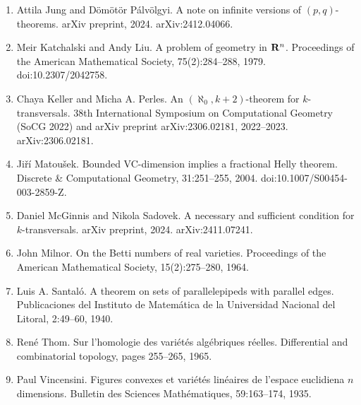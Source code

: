 \documentclass[10pt,a4paper]{amsart}
\begin{document}
\begin{enumerate}
\item[]  [13]  Attila Jung and Dömötör Pálvölgyi.  A note on infinite versions of $(p,q)$-theorems.  arXiv preprint, 2024.  arXiv:2412.04066.  
\item[]  [14]  Meir Katchalski and Andy Liu.  A problem of geometry in ${\bf R}^{n}$.  Proceedings of the American Mathematical Society, 75(2):284–288, 1979.  doi:10.2307/2042758.  
\item[]  [15]  Chaya Keller and Micha A. Perles.  An $(\aleph_{0},k+2)$-theorem for $k$-transversals.  38th International Symposium on Computational Geometry (SoCG 2022) and arXiv preprint arXiv:2306.02181, 2022–2023.  arXiv:2306.02181.  
\item[]  [16]  Jiří Matoušek.  Bounded VC-dimension implies a fractional Helly theorem.  Discrete \& Computational Geometry, 31:251–255, 2004.  doi:10.1007/S00454-003-2859-Z.  
\item[]  [17]  Daniel McGinnis and Nikola Sadovek.  A necessary and sufficient condition for $k$-transversals.  arXiv preprint, 2024.  arXiv:2411.07241.  
\item[]  [18]  John Milnor.  On the Betti numbers of real varieties.  Proceedings of the American Mathematical Society, 15(2):275–280, 1964.  
\item[]  [19]  Luis A. Santaló.  A theorem on sets of parallelepipeds with parallel edges.  Publicaciones del Instituto de Matemática de la Universidad Nacional del Litoral, 2:49–60, 1940.  
\item[]  [20]  René Thom.  Sur l’homologie des variétés algébriques réelles.  Differential and combinatorial topology, pages 255–265, 1965.  
\item[]  [21]  Paul Vincensini.  Figures convexes et variétés linéaires de l’espace euclidiena $n$ dimensions.  Bulletin des Sciences Mathématiques, 59:163–174, 1935.  
\end{enumerate}
\par
\end{document}
